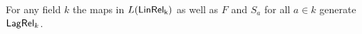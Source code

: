 %
%
%
\begin{theorem}
\label{theorem:generators}
For any field $k$ the maps in $L(\sf LinRel_k)$ as well as $F$ and $S_a$ for all $a \in k$ generate $\mathsf{Lag}\mathsf{Rel}_k$.
\end{theorem}

